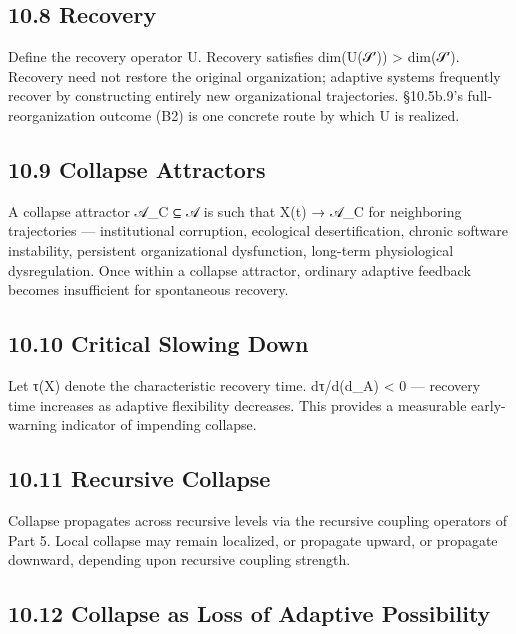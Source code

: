 \documentclass[
]{article}
\begin{document}
\hypertarget{recovery}{%
\subsection{10.8 Recovery}\label{recovery}}

Define the recovery operator U. Recovery satisfies dim(U(𝒮′))
\textgreater{} dim(𝒮′). Recovery need not restore the original
organization; adaptive systems frequently recover by constructing
entirely new organizational trajectories. §10.5b.9's full-reorganization
outcome (B2) is one concrete route by which U is realized.

\hypertarget{collapse-attractors}{%
\subsection{10.9 Collapse Attractors}\label{collapse-attractors}}

A collapse attractor 𝒜\_C ⊆ 𝒜 is such that X(t) → 𝒜\_C for neighboring
trajectories --- institutional corruption, ecological desertification,
chronic software instability, persistent organizational dysfunction,
long-term physiological dysregulation. Once within a collapse attractor,
ordinary adaptive feedback becomes insufficient for spontaneous
recovery.

\hypertarget{critical-slowing-down}{%
\subsection{10.10 Critical Slowing Down}\label{critical-slowing-down}}

Let τ(X) denote the characteristic recovery time. dτ/d(d\_A) \textless{}
0 --- recovery time increases as adaptive flexibility decreases. This
provides a measurable early-warning indicator of impending collapse.

\hypertarget{recursive-collapse}{%
\subsection{10.11 Recursive Collapse}\label{recursive-collapse}}

Collapse propagates across recursive levels via the recursive coupling
operators of Part 5. Local collapse may remain localized, or propagate
upward, or propagate downward, depending upon recursive coupling
strength.

\hypertarget{collapse-as-loss-of-adaptive-possibility}{%
\subsection{10.12 Collapse as Loss of Adaptive
Possibility}\label{collapse-as-loss-of-adaptive-possibility}}
\end{document}
